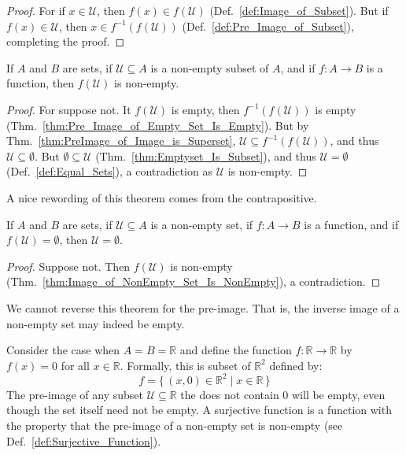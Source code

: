     \begin{proof}
        For if $x\in\mathcal{U}$, then $f(x)\in{f}(\mathcal{U})$
        (Def.~\ref{def:Image_of_Subset}). But if $f(x)\in\mathcal{U}$, then
        $x\in{f}^{\minus{1}}(f(\mathcal{U}))$
        (Def.~\ref{def:Pre_Image_of_Subset}), completing the proof.
    \end{proof}
    \begin{theorem}
        \label{thm:Image_of_NonEmpty_Set_Is_NonEmpty}%
        If $A$ and $B$ are sets, if $\mathcal{U}\subseteq{A}$ is a non-empty
        subset of $A$, and if $f:A\rightarrow{B}$ is a function, then
        $f(\mathcal{U})$ is non-empty.
    \end{theorem}
    \begin{proof}
        For suppose not. It $f(\mathcal{U})$ is empty, then
        $f^{\minus{1}}(f(\mathcal{U}))$ is empty
        (Thm.~\ref{thm:Pre_Image_of_Empty_Set_Is_Empty}). But by
        Thm.~\ref{thm:PreImage_of_Image_is_Superset},
        $\mathcal{U}\subseteq{f}^{\minus{1}}(f(\mathcal{U}))$, and thus
        $\mathcal{U}\subseteq\emptyset$. But $\emptyset\subseteq\mathcal{U}$
        (Thm.~\ref{thm:Emptyset_Is_Subset}), and thus $\mathcal{U}=\emptyset$
        (Def.~\ref{def:Equal_Sets}), a contradiction as $\mathcal{U}$ is
        non-empty.
    \end{proof}
    A nice rewording of this theorem comes from the contrapositive.
    \begin{theorem}
        If $A$ and $B$ are sets, if $\mathcal{U}\subseteq{A}$ is a non-empty
        set, if $f:A\rightarrow{B}$ is a function, and if
        $f(\mathcal{U})=\emptyset$, then $\mathcal{U}=\emptyset$.
    \end{theorem}
    \begin{proof}
        Suppose not. Then $f(\mathcal{U})$ is non-empty
        (Thm.~\ref{thm:Image_of_NonEmpty_Set_Is_NonEmpty}), a contradiction.
    \end{proof}
    We cannot reverse this theorem for the pre-image. That is, the inverse image
    of a non-empty set may indeed be empty.
    \begin{example}
        Consider the case when $A=B=\mathbb{R}$ and define the function
        $f:\mathbb{R}\rightarrow\mathbb{R}$ by $f(x)=0$ for all
        $x\in\mathbb{R}$. Formally, this is subset of $\mathbb{R}^{2}$ defined
        by:
        \begin{equation}
            f=\big\{\,(x,0)\in\mathbb{R}^{2}\;|\;x\in\mathbb{R}\,\big\}
        \end{equation}
        The pre-image of any subset $\mathcal{U}\subseteq\mathbb{R}$ the does
        not contain 0 will be empty, even though the set itself need not be
        empty. A surjective function is a function with the property that the
        pre-image of a non-empty set is non-empty
        (see Def.~\ref{def:Surjective_Function}).
    \end{example}
